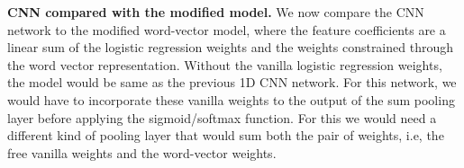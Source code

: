 







\textbf{CNN compared with the modified model.}
We now compare the CNN network to the modified word-vector model, where the feature coefficients are a linear sum of the logistic regression weights and the weights constrained through the word vector representation. Without the vanilla logistic regression weights, the model would be same as the previous 1D CNN network. For this network, we would have to incorporate these vanilla weights to the output of the sum pooling layer before applying the sigmoid/softmax function. For this we would need a different kind of pooling layer that would sum both the pair of weights, i.e, the free vanilla weights and the word-vector weights.

